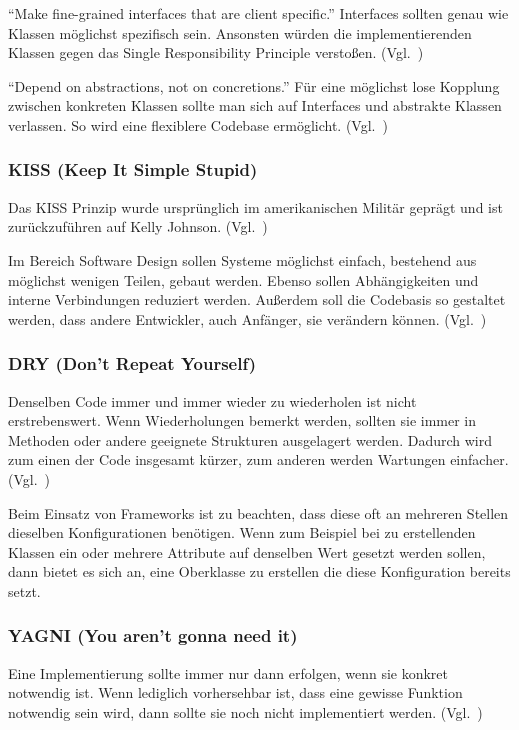 \enquote{Make fine-grained interfaces that are client specific.}\cite{solid}
Interfaces sollten genau wie Klassen möglichst spezifisch sein.
Ansonsten würden die implementierenden Klassen gegen das Single Responsibility Principle verstoßen.
(Vgl.~\cite{design-patterns-php-laravel})

\enquote{Depend on abstractions, not on concretions.}\cite{solid}
Für eine möglichst lose Kopplung zwischen konkreten Klassen sollte man sich auf Interfaces und abstrakte Klassen verlassen.
So wird eine flexiblere Codebase ermöglicht.
(Vgl.~\cite{design-patterns-php-laravel})

\subsubsection{KISS (Keep It Simple Stupid)}
Das KISS Prinzip wurde ursprünglich im amerikanischen Militär geprägt und ist zurückzuführen auf Kelly Johnson.
(Vgl.~\cite{kelly-johnson-memoir})

Im Bereich Software Design sollen Systeme möglichst einfach, bestehend aus möglichst wenigen Teilen, gebaut werden.
Ebenso sollen Abhängigkeiten und interne Verbindungen reduziert werden.
Außerdem soll die Codebasis so gestaltet werden, dass andere Entwickler, auch Anfänger, sie verändern können.
(Vgl.~\cite{kiss-principle-explained})

\subsubsection{DRY (Don’t Repeat Yourself)}
Denselben Code immer und immer wieder zu wiederholen ist nicht erstrebenswert.
Wenn Wiederholungen bemerkt werden, sollten sie immer in Methoden oder andere geeignete Strukturen ausgelagert werden.
Dadurch wird zum einen der Code insgesamt kürzer, zum anderen werden Wartungen einfacher.
(Vgl.~\cite{the-pragmatic-programmer})

Beim Einsatz von Frameworks ist zu beachten, dass diese oft an mehreren Stellen dieselben Konfigurationen benötigen.
Wenn zum Beispiel bei zu erstellenden Klassen ein oder mehrere Attribute auf denselben Wert gesetzt werden sollen, dann bietet es sich an, eine Oberklasse zu erstellen die diese Konfiguration bereits setzt.

\subsubsection{YAGNI (You aren't gonna need it)}
Eine Implementierung sollte immer nur dann erfolgen, wenn sie konkret notwendig ist.
Wenn lediglich vorhersehbar ist, dass eine gewisse Funktion notwendig sein wird, dann sollte sie noch nicht implementiert werden.
(Vgl.~\cite{extreme-programming-installed})

